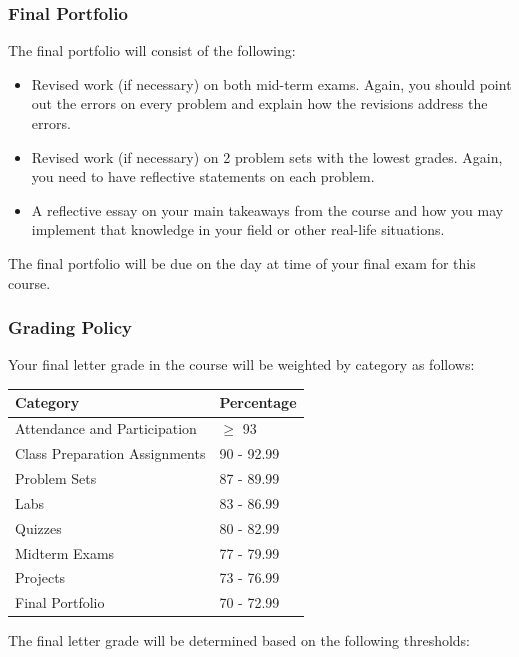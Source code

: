 \documentclass[
  letterpaper,
  DIV=11,
  numbers=noendperiod]{scrartcl}
\providecommand{\tightlist}{%
  \setlength{\itemsep}{0pt}\setlength{\parskip}{0pt}}\usepackage{longtable,booktabs,array}
\begin{document}
\subsubsection{Final Portfolio}\label{final-portfolio}

The final portfolio will consist of the following:

\begin{itemize}
\tightlist
\item
  Revised work (if necessary) on both mid-term exams. Again, you should
  point out the errors on every problem and explain how the revisions
  address the errors.
\item
  Revised work (if necessary) on 2 problem sets with the lowest grades.
  Again, you need to have reflective statements on each problem.
\item
  A reflective essay on your main takeaways from the course and how you
  may implement that knowledge in your field or other real-life
  situations.
\end{itemize}

The final portfolio will be due on the day at time of your final exam
for this course.

\subsubsection{Grading Policy}\label{grading-policy}

Your final letter grade in the course will be weighted by category as
follows:

\begin{longtable}[]{@{}ll@{}}
\toprule\noalign{}
Category & Percentage \\
\midrule\noalign{}
\endhead
\bottomrule\noalign{}
\endlastfoot
Attendance and Participation & \(\ge\) 93 \\
Class Preparation Assignments & 90 - 92.99 \\
Problem Sets & 87 - 89.99 \\
Labs & 83 - 86.99 \\
Quizzes & 80 - 82.99 \\
Midterm Exams & 77 - 79.99 \\
Projects & 73 - 76.99 \\
Final Portfolio & 70 - 72.99 \\
\end{longtable}

The final letter grade will be determined based on the following
thresholds:
\end{document}

